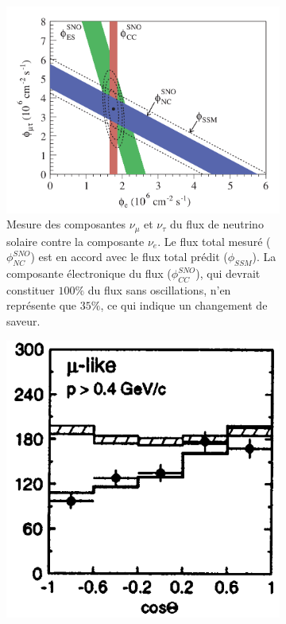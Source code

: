             \begin{figure}[htbp]
                \begin{subfigure}[t]{0.56\textwidth}
                    \includegraphics[width=\textwidth]{Chapitre_1/pictures/SNO_plot.png}
                    \caption{Mesure des composantes $\nu_{\mu}$ et $\nu_{\tau}$ du flux de neutrino solaire contre la composante $\nu_e$\cite{Aharmim2013}. Le flux total mesuré ($\phi_{NC}^{SNO}$) est en accord avec le flux total prédit ($\phi_{SSM}$). La composante électronique du flux ($\phi_{CC}^{SNO}$), qui devrait constituer $100\%$ du flux sans oscillations, n'en représente que $35\%$, ce qui indique un changement de saveur.}
                    \label{fig::SNO_plot}
                \end{subfigure}
                \hfill 
                \begin{subfigure}[t]{0.4\textwidth}
                    \includegraphics[width=\textwidth]{Chapitre_1/pictures/superK_plot.png}

\end{subfigure}
\end{figure}
